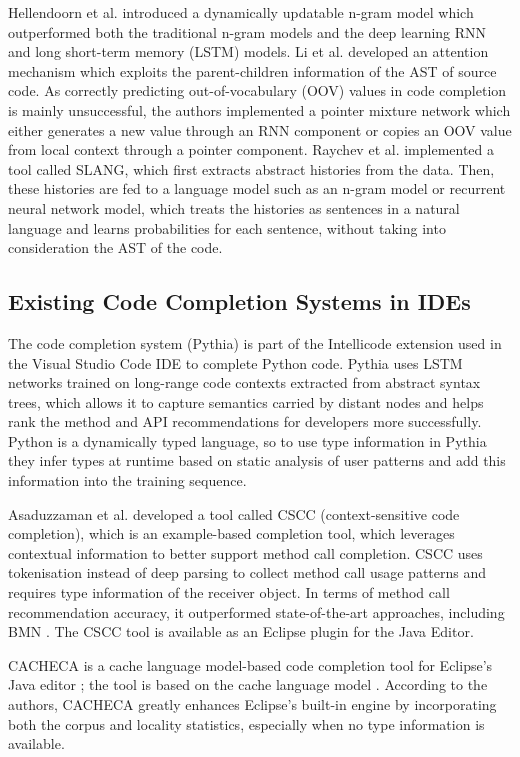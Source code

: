 \documentclass[sigplan,screen]{acmart}
\begin{document}
Hellendoorn et al. \cite{Hell17a} introduced a dynamically updatable n-gram model which outperformed both the traditional n-gram models and the deep learning RNN and long short-term memory (LSTM) models. Li et al. \cite{Li17a} developed an attention mechanism which exploits the parent-children information of the AST of source code. As correctly predicting out-of-vocabulary (OOV) values in code completion is mainly unsuccessful, the authors implemented a pointer mixture network which either generates a new value through an RNN component or copies an OOV value from local context through a pointer component. Raychev et al. \cite{Rayc14a} implemented a tool called SLANG, which first extracts abstract histories from the data. Then, these histories are fed to a language model such as an n-gram model or recurrent neural network model, which treats the histories as sentences in a natural language and learns probabilities for each sentence, without taking into consideration the AST of the code.

\subsection{Existing Code Completion Systems in IDEs}
The code completion system (Pythia) \cite{Svya19a} is part of the Intellicode extension used in the Visual Studio Code IDE to complete Python code. Pythia uses LSTM networks trained on long-range code contexts extracted from abstract syntax trees, which allows it to capture semantics carried by distant nodes and helps rank the method and API recommendations for developers more successfully. Python is a dynamically typed language, so to use type information in Pythia they infer types at runtime based on static analysis of user patterns and add this information into the training sequence.

Asaduzzaman et al. \cite{Asad14a} developed a tool called CSCC (context-sensitive code completion), which is an example-based completion tool, which leverages contextual information to better support method call completion. CSCC uses tokenisation instead of deep parsing to collect method call usage patterns and requires type information of the receiver object. In terms of method call recommendation accuracy, it outperformed state-of-the-art approaches, including BMN \cite{Bruc09a}. The CSCC tool is available as an Eclipse plugin for the Java Editor.

CACHECA is a cache language model-based code completion tool for Eclipse's Java editor \cite{Fran15a}; the tool is based on the cache language model \cite{Tu14a}. According to the authors, CACHECA greatly enhances Eclipse's built-in engine by incorporating both the corpus and locality statistics, especially when no type information is available.
\end{document}
